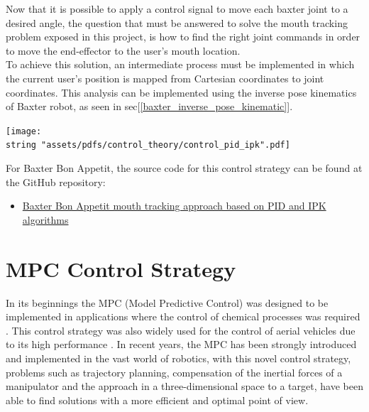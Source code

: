 \documentclass[11pt]{report} %
\begin{document}
Now that it is possible to apply a control signal to move each baxter joint to a desired angle, the question that must be answered to solve the mouth tracking problem exposed in this project, is how to find the right joint commands in order to move the end-effector to the user's mouth location.\\

To achieve this solution, an intermediate process must be implemented in which the current user's position is mapped from Cartesian coordinates to joint coordinates. This analysis can be implemented using the inverse pose kinematics of Baxter robot, as seen in sec[\ref{baxter_inverse_pose_kinematic}]. \\

\begin{center}
\texttt{[image: \\string "assets/pdfs/control\_theory/control\_pid\_ipk".pdf]}
\bigbreak
\begin{minipage}{\linewidth} %
\label{fig_baxter_ipk_pid_controller}
\end{minipage} \end{center}

For Baxter Bon Appetit, the source code for this control strategy can be found at the GitHub repository:

\begin{itemize}
    \color{blue}
    \item \href{https://github.com/san99tiago/baxter-bon-appetit/blob/main/python/baxter_bon_appetit/scripts/node_open_loop_control_trajectory.py}{Baxter Bon Appetit mouth tracking approach based on PID and IPK algorithms}
\end{itemize}

\section{MPC Control Strategy}

In its beginnings the MPC (Model Predictive Control) was designed to be implemented in applications where the control of chemical processes was required \citep{cite_model_predictive_control_theory_and_practice}. This control strategy was also widely used for the control of aerial vehicles due to its high performance \citep{cite_receding_horizon_control_aerial_vehicles}. In recent years, the MPC has been strongly introduced and implemented in the vast world of robotics, with this novel control strategy, problems such as trajectory planning, compensation of the inertial forces of a manipulator and the approach in a three-dimensional space to a target, have been able to find solutions with a more efficient and optimal point of view. \\
\end{document}

